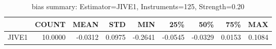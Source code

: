 \begin{table}[ht]
\centering
\caption{bias summary: Estimator=JIVE1, Instruments=125, Strength=0.20}
\begin{tabular}{lrrrrrrrr}
\toprule
 & COUNT & MEAN & STD & MIN & 25\% & 50\% & 75\% & MAX \\
\midrule
JIVE1 & 10.0000 & -0.0312 & 0.0975 & -0.2641 & -0.0545 & -0.0329 & 0.0153 & 0.1084 \\
\bottomrule
\end{tabular}
\end{table}
